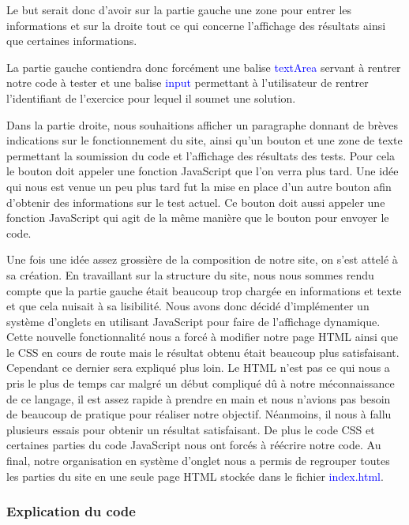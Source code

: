\documentclass[a4paper]{article}
\renewcommand{\texttt}[2][blue]{\textcolor{#1}{\ttfamily #2}}
\begin{document}
 \begin{multicols}{2}
   Le but serait donc d'avoir sur la partie gauche une zone pour entrer les
   informations et sur la droite tout ce qui concerne l'affichage des
   résultats ainsi que certaines informations.

   La partie gauche contiendra donc forcément une balise \texttt{textArea}
   servant à rentrer notre code à tester et une balise \texttt{input}
   permettant à l'utilisateur de rentrer l'identifiant de l'exercice pour
   lequel il soumet une solution.

   Dans la partie droite, nous souhaitions afficher un paragraphe donnant de
   brèves indications sur le fonctionnement du site, ainsi qu'un bouton et une
   zone de texte permettant la soumission du code et l'affichage des résultats
   des tests. Pour cela le bouton doit appeler une fonction JavaScript que l'on
   verra plus tard. Une idée qui nous est venue un peu plus tard fut la mise
   en place d'un autre bouton afin d'obtenir des informations sur le test
   actuel. Ce bouton doit aussi appeler une fonction JavaScript qui agit de la
   même manière que le bouton pour envoyer le code.

   Une fois une idée assez grossière de la composition de notre site, on s'est
   attelé à sa création. En travaillant sur la structure du site, nous nous
   sommes rendu compte que la partie gauche était beaucoup trop chargée en
   informations et texte et que cela nuisait à sa lisibilité. Nous avons donc
   décidé d'implémenter un système d'onglets en utilisant JavaScript pour
   faire de l'affichage dynamique. Cette nouvelle fonctionnalité nous a forcé
   à modifier notre page HTML ainsi que le CSS  en cours de route mais le
   résultat obtenu était beaucoup plus satisfaisant. Cependant ce dernier sera
   expliqué plus loin. Le HTML n'est pas ce qui nous a pris le plus de temps
   car malgré un début compliqué dû à notre méconnaissance de ce langage, il
   est assez rapide à prendre en main et nous n'avions pas besoin de beaucoup
   de pratique pour réaliser notre objectif. Néanmoins, il nous à fallu
   plusieurs essais pour obtenir un résultat satisfaisant. De plus le code CSS et
   certaines parties du code JavaScript nous ont forcés à réécrire notre code. Au
   final, notre organisation en système d'onglet nous a permis de regrouper
   toutes les parties du site en une seule page HTML stockée dans le fichier
   \texttt{index.html}.
 \end{multicols}

  \subsubsection{Explication du code}
\end{document}
